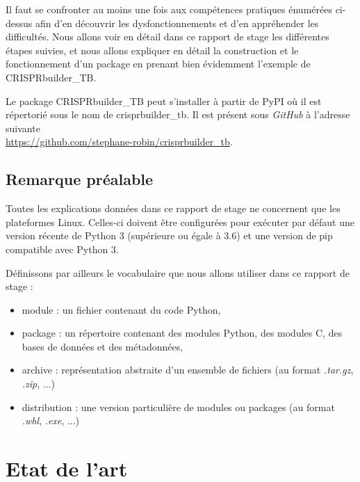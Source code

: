 \documentclass[twoside,a4paper,11pt,frenchb,openany]{report}
\begin{document}
Il faut se confronter au moins une fois aux compétences pratiques énumérées ci-dessus afin d'en découvrir les dysfonctionnements et d'en appréhender les difficultés. Nous allons voir en détail dans ce rapport de stage les différentes étapes suivies, et nous allons expliquer en détail la construction et le fonctionnement d'un package en prenant bien évidemment l'exemple de CRISPRbuilder\_TB.

Le package CRISPRbuilder\_TB peut s'installer à partir de PyPI où il est répertorié sous le nom de crisprbuilder\_tb. Il est présent sous \textit{GitHub} à l'adresse suivante \\\url{https://github.com/stephane-robin/crisprbuilder_tb}.




\section{Remarque préalable}

Toutes les explications données dans ce rapport de stage ne concernent que les plateformes Linux. Celles-ci doivent être configurées pour exécuter par défaut une version récente de Python 3 (supérieure ou égale à 3.6) et une version de pip compatible avec Python 3.

Définissons par ailleurs le vocabulaire que nous allons utiliser dans ce rapport de stage :
\begin{itemize}
\item {}module : un fichier contenant du code Python,
\item package : un répertoire contenant des modules Python, des modules C, des bases de données et des métadonnées,
\item {}archive : représentation abstraite d'un ensemble de fichiers (au format \textit{.tar.gz}, \textit{.zip}, ...)
\item {}distribution : une version particulière de modules ou packages (au format \textit{.whl}, \textit{.exe}, ...)
\end{itemize}






\chapter{Etat de l'art}


\end{document}
